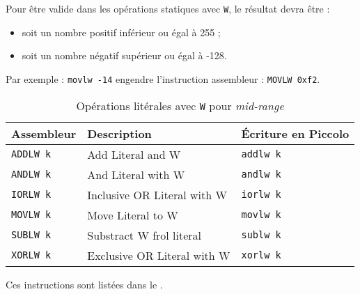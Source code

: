Pour être valide dans les opérations statiques avec \texttt{W}, le résultat devra être :
\begin{itemize}
  \item soit un nombre positif inférieur ou égal à 255 ;
  \item soit un nombre négatif supérieur ou égal à -128.
\end{itemize}

Par exemple : \texttt{movlw -14} engendre l’instruction assembleur : \texttt{MOVLW 0xf2}.


\begin{table}[!ht]
  \centering
  \small
  \begin{tabular}{lll}
    \textbf{Assembleur} & \textbf{Description} & \textbf{Écriture en Piccolo}\\
    \hline
    \texttt{ADDLW k} & Add Literal and W & \texttt{addlw k}\\
    \texttt{ANDLW k} & And Literal with W & \texttt{andlw k}\\
    \texttt{IORLW k} & Inclusive OR Literal with W & \texttt{iorlw k}\\
    \texttt{MOVLW k} & Move Literal to W & \texttt{movlw k}\\
    \texttt{SUBLW k} & Substract W frol literal & \texttt{sublw k}\\
    \texttt{XORLW k} & Exclusive OR Literal with W & \texttt{xorlw k}\\
    \hline
  \end{tabular}
  \caption{Opérations litérales avec \texttt{W} pour \emph{mid-range}}
\end{table}



Ces instructions sont listées dans le .

